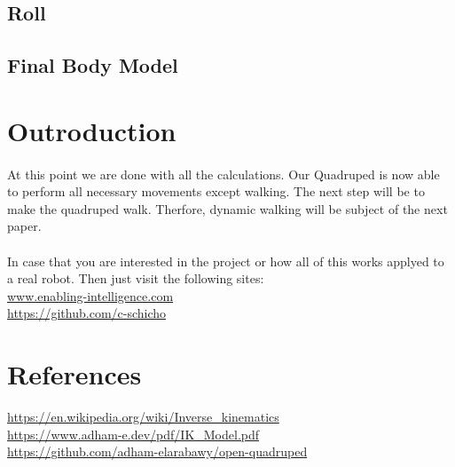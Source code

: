 \documentclass{article}
\begin{document}
    \subsection{Roll}
    \paragraph{}

    \subsection{Final Body Model}
    \paragraph{}



    \section{Outroduction}
    \paragraph{}
    At this point we are done with all the calculations. Our Quadruped is now able to perform all necessary movements except walking. The next step will be to make the quadruped walk. Therfore, dynamic walking will be subject of the next paper.
    \paragraph{}
    In case that you are interested in the project or how all of this works applyed to a real robot. Then just visit the following sites: \\
    \url{www.enabling-intelligence.com} \\
    \url{https://github.com/c-schicho}



    \section{References}
    \url{https://en.wikipedia.org/wiki/Inverse_kinematics} \\
    \url{https://www.adham-e.dev/pdf/IK_Model.pdf} \\
    \url{https://github.com/adham-elarabawy/open-quadruped}
\end{document}
